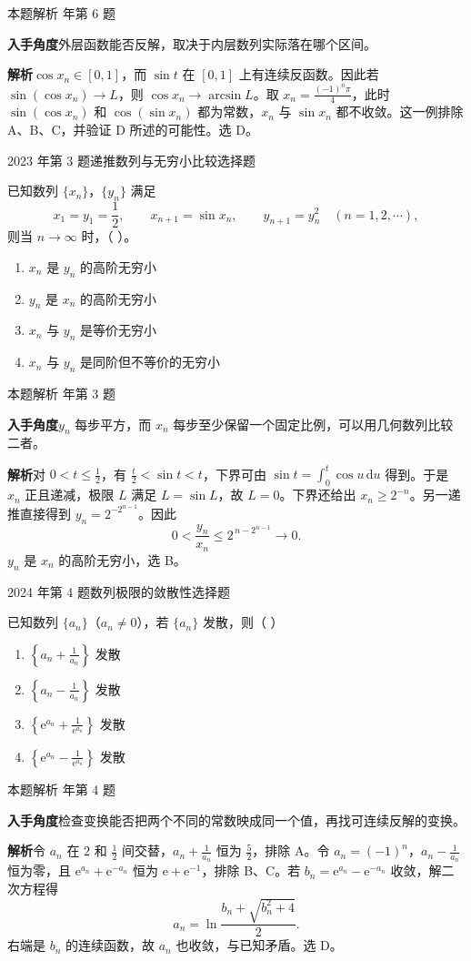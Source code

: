 \documentclass[UTF8,zihao=-4,fontset=fandol]{ctexart}
\newenvironment{abcd}{\begin{enumerate}[label=\textup{(\Alph*)},leftmargin=2.3em,itemsep=1pt,topsep=4pt,parsep=1pt]}{\end{enumerate}}
\newcommand{\choices}[4]{%
  \begin{abcd}
    \item #1
    \item #2
    \item #3
    \item #4
  \end{abcd}}
\newcommand{\QuestionPage}[6]{%
  \par\noindent\begin{minipage}{\linewidth}
  \raggedright
  {\small\textcolor{black!60}{#3\quad #5}\hfill\textcolor{accent}{#2}}\par\smallskip}
\newcommand{\QuestionEnd}{\end{minipage}\par\medskip}
\newcommand{\QuestionPage}[6]{%
  \clearpage
  {\small\textcolor{accent}{#1\hfill #2}}\par\medskip
  {\small\textcolor{black!60}{#3\quad #5\hfill #6}}\par\vspace{9bp}}
\newcommand{\QuestionEnd}{}
\newenvironment{QuestionSolution}[1]{%
  \clearpage
  {\small\textcolor{black!60}{本题解析\quad #1}}\par\medskip
}{\par\clearpage}
\begin{document}
\begin{QuestionSolution}{2022 年第 6 题}
\textbf{入手角度}\quad 外层函数能否反解，取决于内层数列实际落在哪个区间。

\textbf{解析}\quad \(\cos x_n\in[0,1]\)，而 \(\sin t\) 在 \([0,1]\) 上有连续反函数。因此若 \(\sin(\cos x_n)\to L\)，则 \(\cos x_n\to\arcsin L\)。取 \(x_n=\frac{(-1)^n\pi}{4}\)，此时 \(\sin(\cos x_n)\) 和 \(\cos(\sin x_n)\) 都为常数，\(x_n\) 与 \(\sin x_n\) 都不收敛。这一例排除 A、B、C，并验证 D 所述的可能性。选 D。
\end{QuestionSolution}

\QuestionPage{1.2 数列的极限}{选择题}{2023 年第 3 题}{1}{递推数列与无穷小比较}{005 / 234}
已知数列 \(\{x_n\}\)，\(\{y_n\}\) 满足
\[x_1=y_1=\frac12,\qquad x_{n+1}=\sin x_n,\qquad y_{n+1}=y_n^2\quad (n=1,2,\cdots),
\]
则当 \(n\to\infty\) 时，（ ）。
\choices{\(x_n\) 是 \(y_n\) 的高阶无穷小}{\(y_n\) 是 \(x_n\) 的高阶无穷小}{\(x_n\) 与 \(y_n\) 是等价无穷小}{\(x_n\) 与 \(y_n\) 是同阶但不等价的无穷小}
\QuestionEnd

\begin{QuestionSolution}{2023 年第 3 题}
\textbf{入手角度}\quad \(y_n\) 每步平方，而 \(x_n\) 每步至少保留一个固定比例，可以用几何数列比较二者。

\textbf{解析}\quad 对 \(0<t\le\frac{1}{2}\)，有 \(\frac{t}{2}<\sin t<t\)，下界可由 \(\sin t=\int_0^t\cos u\,\mathrm{d}u\) 得到。于是 \(x_n\) 正且递减，极限 \(L\) 满足 \(L=\sin L\)，故 \(L=0\)。下界还给出 \(x_n\ge 2^{-n}\)。另一递推直接得到 \(y_n=2^{-2^{n-1}}\)。因此
\[
0<\frac{y_n}{x_n}\le 2^{\,n-2^{n-1}}\longrightarrow0.
\]
\(y_n\) 是 \(x_n\) 的高阶无穷小，选 B。
\end{QuestionSolution}

\QuestionPage{1.2 数列的极限}{选择题}{2024 年第 4 题}{1}{数列极限的敛散性}{006 / 234}
已知数列 \(\{a_n\}\)（\(a_n\ne 0\)），若 \(\{a_n\}\) 发散，则（ ）
\choices{\(\left\{a_n+\frac{1}{a_n}\right\}\) 发散}{\(\left\{a_n-\frac{1}{a_n}\right\}\) 发散}{\(\left\{\mathrm{e}^{a_n}+\frac{1}{\mathrm{e}^{a_n}}\right\}\) 发散}{\(\left\{\mathrm{e}^{a_n}-\frac{1}{\mathrm{e}^{a_n}}\right\}\) 发散}
\QuestionEnd

\begin{QuestionSolution}{2024 年第 4 题}
\textbf{入手角度}\quad 检查变换能否把两个不同的常数映成同一个值，再找可连续反解的变换。

\textbf{解析}\quad 令 \(a_n\) 在 \(2\) 和 \(\frac{1}{2}\) 间交替，\(a_n+\frac{1}{a_n}\) 恒为 \(\frac{5}{2}\)，排除 A。令 \(a_n=(-1)^n\)，\(a_n-\frac{1}{a_n}\) 恒为零，且 \(\mathrm{e}^{a_n}+\mathrm{e}^{-a_n}\) 恒为 \(\mathrm{e}+\mathrm{e}^{-1}\)，排除 B、C。若 \(b_n=\mathrm{e}^{a_n}-\mathrm{e}^{-a_n}\) 收敛，解二次方程得
\[
a_n=\ln\frac{b_n+\sqrt{b_n^2+4}}2.
\]
右端是 \(b_n\) 的连续函数，故 \(a_n\) 也收敛，与已知矛盾。选 D。
\end{QuestionSolution}
\end{document}
